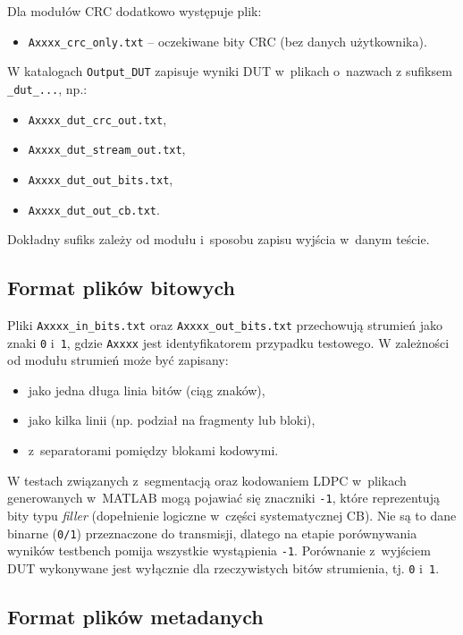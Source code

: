 Dla modułów CRC dodatkowo występuje plik:
\begin{itemize}
    \item \texttt{Axxxx\_crc\_only.txt} -- oczekiwane bity CRC (bez danych użytkownika).
\end{itemize}

W katalogach \texttt{Output\_DUT}  zapisuje wyniki DUT w~plikach o~nazwach
z sufiksem \texttt{\_dut\_...}, np.:
\begin{itemize}
    \item \texttt{Axxxx\_dut\_crc\_out.txt},
    \item \texttt{Axxxx\_dut\_stream\_out.txt},
    \item \texttt{Axxxx\_dut\_out\_bits.txt},
    \item \texttt{Axxxx\_dut\_out\_cb.txt}.
\end{itemize}
Dokładny sufiks zależy od modułu i~sposobu zapisu wyjścia w~danym teście.

\subsection{Format plików bitowych}
\label{subsec:wektory_format_bitow}

Pliki \texttt{Axxxx\_in\_bits.txt} oraz \texttt{Axxxx\_out\_bits.txt} przechowują strumień jako
znaki \texttt{0} i~\texttt{1}, gdzie \texttt{Axxxx} jest identyfikatorem przypadku testowego.
W zależności od modułu strumień może być zapisany:
\begin{itemize}
    \item jako jedna długa linia bitów (ciąg znaków),
    \item jako kilka linii (np. podział na fragmenty lub bloki),
    \item z~separatorami pomiędzy blokami kodowymi.
\end{itemize}

W testach związanych z~segmentacją oraz kodowaniem LDPC w~plikach generowanych w~MATLAB mogą pojawiać się
znaczniki \texttt{-1}, które reprezentują bity typu \emph{filler} (dopełnienie logiczne w~części systematycznej CB).
Nie są to dane binarne (\texttt{0/1}) przeznaczone do transmisji, dlatego na etapie porównywania wyników
testbench pomija wszystkie wystąpienia \texttt{-1}. Porównanie z~wyjściem DUT wykonywane jest wyłącznie
dla rzeczywistych bitów strumienia, tj. \texttt{0} i~\texttt{1}.


\subsection{Format plików metadanych}
\label{subsec:wektory_meta}


